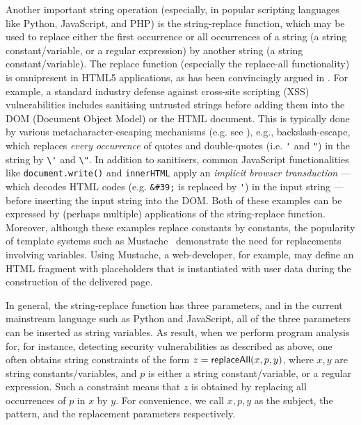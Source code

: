Another important string operation (especially, in popular scripting
languages like Python, JavaScript, and PHP) is the string-replace function, 
which may be used to replace either the first occurrence or
all occurrences of a string (a string constant/variable, or a regular expression) by 
another string (a string constant/variable). The replace function (especially 
the replace-all functionality) is omnipresent in HTML5 applications, as has
been convincingly argued in \cite{LB16,TCJ16,YABI14}. 
For
example, a standard industry defense against cross-site scripting 
(XSS) vulnerabilities includes sanitising untrusted strings before adding them
into the DOM (Document Object Model) or the HTML document. 
This is typically done by %
various metacharacter-escaping mechanisms (e.g. see 
\cite{Kern14,BEK,OWASP-XSS}), e.g., backslash-escape, which replaces \emph{every
occurrence} of quotes and double-quotes (i.e. \verb+'+ and \verb+"+) in the
string by \verb+\'+ and \verb+\"+. 
In addition
to sanitisers, common JavaScript functionalities like \texttt{document.write()} 
and \texttt{innerHTML} apply an \emph{implicit browser transduction} --- which
decodes HTML codes (e.g. \verb+&#39;+ is replaced by \verb+'+) in the input 
string --- before inserting the input string into the DOM.
Both of these examples can be expressed by (perhaps multiple) 
applications of the string-replace function.
Moreover, although these examples replace constants by constants, the popularity of template systems such as Mustache~\cite{Mustache} demonstrate the need for replacements involving variables.
Using Mustache, a web-developer, for example, may define an HTML fragment with placeholders that is instantiated with user data during the construction of the delivered page.


In general, the string-replace function has three parameters, and in the current mainstream language such as Python and JavaScript, all of the three parameters can be inserted as string variables. As result, when we perform program analysis for, for instance, detecting security vulnerabilities as described as above, one often obtains string constraints of the form $z= \mathsf{replaceAll}(x, p, y)$, where $x,y$ are string constants/variables, and $p$ is either a string constant/variable, or a regular expression.
Such a constraint means that $z$ is obtained by replacing all occurrences of $p$ in $x$ by $y$. For convenience, we call $x, p, y$ as the subject, the pattern, and the replacement parameters respectively. 

